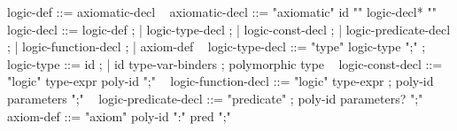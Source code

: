 \begin{syntax}
  logic-def ::= { axiomatic-decl }
  \
  { axiomatic-decl } ::= { "axiomatic" id "{" logic-decl* "}" }
  \
  { logic-decl } ::= { logic-def } ;
  | { logic-type-decl } ;
  | { logic-const-decl } ;
  | { logic-predicate-decl } ;
  | { logic-function-decl } ;
  | { axiom-def }
  \
  { logic-type-decl } ::= { "type" logic-type ";" } ;
  \
  { logic-type } ::= { id } ;
  | { id type-var-binders } ; polymorphic type
  \
  { logic-const-decl } ::=  { "logic" type-expr poly-id ";" }
  \
  { logic-function-decl } ::=
  { "logic" type-expr } ;
  { poly-id parameters ";" }
  \
  { logic-predicate-decl } ::=
  { "predicate" } ;
  { poly-id parameters? ";" }
  \
  { axiom-def } ::= { "axiom" poly-id ":" pred ";" }
\end{syntax}
